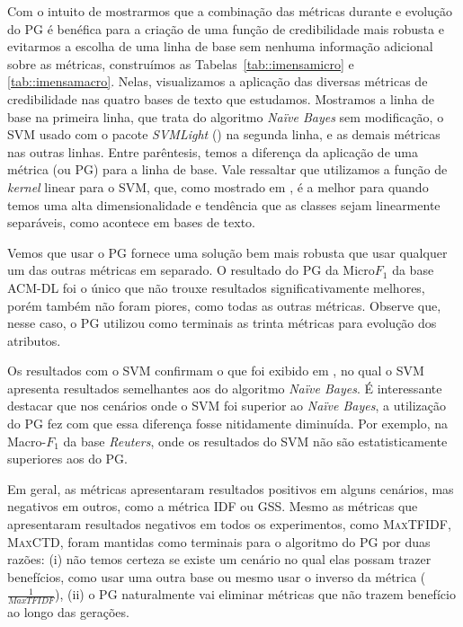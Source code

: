 Com o intuito de mostrarmos que a combinação das métricas durante e evolução do \textsc{PG} é benéfica para a criação de uma função de credibilidade mais robusta e evitarmos a escolha de uma linha de base sem nenhuma informação adicional sobre as métricas, construímos as Tabelas~\ref{tab::imensamicro} e \ref{tab::imensamacro}.
Nelas, visualizamos a aplicação das diversas métricas de credibilidade nas quatro bases de texto que estudamos. Mostramos a linha de base na primeira linha, que trata do algoritmo \textit{Naïve Bayes} sem modificação, o \textsc{SVM} usado com o pacote \textit{SVMLight} (\cite{SVM}) na segunda linha, e as demais métricas nas outras linhas.
Entre parêntesis, temos a diferença da aplicação de uma métrica (ou \textsc{PG}) para a linha de base.
Vale ressaltar que utilizamos a função de \textit{kernel} linear para o \textsc{SVM}, que, como mostrado em \cite{Salles10}, é a melhor para quando temos uma alta dimensionalidade e tendência que as classes sejam linearmente separáveis, como acontece em bases de texto.

Vemos que usar o \textsc{PG} fornece uma solução bem mais robusta que usar qualquer um das outras métricas em separado. O resultado do \textsc{PG} da Micro$F_1$ da base \textsc{ACM-DL} foi o único que não trouxe resultados significativamente melhores, porém também não foram piores, como todas as outras métricas.
Observe que, nesse caso, o \textsc{PG} utilizou como terminais as trinta métricas para evolução dos atributos.

Os resultados com o \textsc{SVM} confirmam o que foi exibido em \cite{Salles10}, no qual o \textsc{SVM} apresenta resultados semelhantes aos do algoritmo \textit{Naïve Bayes}. É interessante destacar que nos cenários onde o \textsc{SVM} foi superior ao \textit{Naïve Bayes}, a utilização do \textsc{PG} fez com que essa diferença fosse nitidamente diminuída. Por exemplo, na Macro-$F_1$ da base \textit{Reuters}, onde os resultados do \textsc{SVM} não são estatisticamente superiores aos do \textsc{PG}.

Em geral, as métricas apresentaram resultados positivos em alguns cenários, mas negativos em outros, como a métrica \textsc{IDF} ou \textsc{GSS}. Mesmo as métricas que apresentaram resultados negativos em todos os experimentos, como \textsc{MaxTFIDF}, \textsc{MaxCTD}, foram mantidas como terminais para o algoritmo do \textsc{PG} por duas razões: (i) não temos certeza se existe um cenário no qual elas possam trazer benefícios, como usar uma outra base ou mesmo usar o inverso da métrica ($\frac{1}{MaxTFIDF}$), (ii) o \textsc{PG} naturalmente vai eliminar métricas que não trazem benefício ao longo das gerações.

